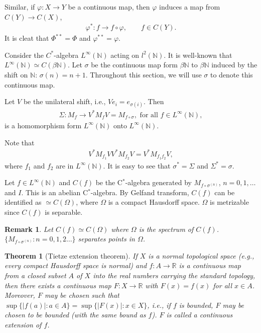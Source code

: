 \documentclass[a4paper,10pt]{amsart}
\newtheorem{theorem}{Theorem}[section]
\newtheorem{remark}{Remark}[section]
\newcommand{\R}{\mathbb R}  %
\newcommand{\N}{\mathbb N} %
\begin{document}
Similar, if $\varphi: X \rightarrow Y$ be a continuous map, then
$\varphi$ induces a map from $C(Y) \rightarrow C(X)$,
\begin{align*}
    \varphi^{*}: f \rightarrow f \circ \varphi, \qquad 
    f \in C(Y).
\end{align*}
It is cleat that $\varPhi^{**} = \varPhi$ and $\varphi^{**} = \varphi$.

Consider the $C^{*}$-algebra $L^{\infty}(\N)$ acting on $l^{2}(\N)$.
It is well-known that  $L^{\infty}(\N) \simeq C(\beta \N)$.
Let $\sigma$ be the continuous map form $\beta \N$ to $\beta \N$
induced by the shift on $\N$: $\sigma(n) = n+1$.
Throughout this section, we will use $\sigma$ to denote this
continuous map.

Let $V$ be the unilateral shift, i.e., $V e_{i} = e_{\sigma(i)}$.
Then
\begin{align*}
    \Sigma: M_{f} \rightarrow V^{*}M_{f}V = M_{f \circ \sigma}, 
    \mbox{ for all } f 
    \in L^{\infty}(\N),
\end{align*}
is a homomorphism form $L^{\infty}(\N)$ onto $L^{\infty}(\N)$.

Note that 
\begin{align*}
    V^{*}M_{f_1}VV^{*}M_{f_2}V = V^{*}M_{f_{1}f_{2}}V,
\end{align*}
where $f_1$ and $f_2$ are in $L^{\infty}(\N)$.
It is easy to see that $\sigma^{*} = \Sigma$ and $\Sigma^{*} = \sigma$.

Let $f \in L^{\infty}(\N)$ and $C(f)$ be the C$^*$-algebra generated
by $M_{f \circ \sigma^{(n)}}$, $n = 0, 1, \ldots$ 
and $I$. This is an abelian 
C$^*$-algebra. By Gelfand transform, $C(f)$ can be identified as
$\simeq C(\Omega)$, where $\Omega$ is a compact Hausdorff 
space. $\Omega$ is metrizable since $C(f)$ is separable.

\begin{remark}
    Let $C(f) \simeq C(\Omega)$ where $\Omega$ is the spectrum of $C(f)$.
    $\{M_{f \circ \sigma^{(n)}} : n = 0, 1, 2 \ldots \}$ 
    separates points in $\Omega$.
\end{remark}

\begin{theorem}[Tietze extension theorem]
    If $X$ is a normal topological space (e.g., every compact Hausdorff 
    space is normal) and $f: A \rightarrow \R$ is a continuous map 
    from a closed subset $A$ of $X$ into the real numbers 
    carrying the standard topology, then there exists a continuous map
    $F: X \to \R$ with $F(x) = f(x)$ for all $x \in A$.
    Moreover, $F$ may be chosen such that 
    $\sup \{ |f(a)| : a \in A \} = \sup \{ |F(x)| : x \in X \}$, i.e., 
    if $f$ is bounded, $F$ may be chosen to be bounded 
    (with the same bound as $f$). $F$ is called a continuous 
    extension of $f$.
\end{theorem}
\end{document}
